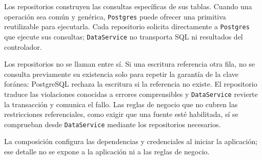 Los repositorios construyen las consultas específicas de sus tablas. Cuando una
operación sea común y genérica, \texttt{Postgres} puede ofrecer una primitiva
reutilizable para ejecutarla. Cada repositorio solicita directamente a
\texttt{Postgres} que ejecute sus consultas; \texttt{DataService} no transporta
SQL ni resultados del controlador.

Los repositorios no se llaman entre sí. Si una escritura referencia otra fila,
no se consulta previamente su existencia solo para repetir la garantía de la
clave foránea: PostgreSQL rechaza la escritura si la referencia no existe. El
repositorio traduce las violaciones conocidas a errores comprensibles y
\texttt{DataService} revierte la transacción y comunica el fallo. Las reglas de
negocio que no cubren las restricciones referenciales, como exigir que una fuente
esté habilitada, sí se comprueban desde \texttt{DataService} mediante los
repositorios necesarios.

La composición configura las dependencias y credenciales al iniciar la
aplicación; ese detalle no se expone a la aplicación ni a las reglas de negocio.
